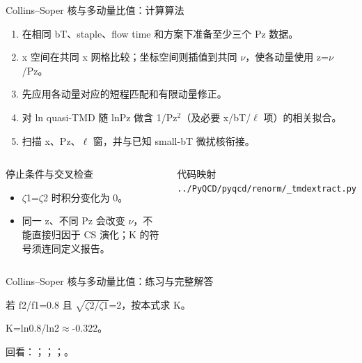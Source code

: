 \begin{frame}[t]{Collins--Soper 核与多动量比值：计算算法}
\footnotesize
{}\begin{enumerate}
\item 在相同 bT、staple、flow time 和方案下准备至少三个 Pz 数据。
\item x 空间在共同 x 网格比较；坐标空间则插值到共同 \ensuremath{\nu}，使各动量使用 z=\ensuremath{\nu}/\allowbreak{}Pz。
\item 先应用各动量对应的短程匹配和有限动量修正。
\item 对 ln quasi-TMD 随 lnPz 做含 1/\allowbreak{}Pz\ensuremath{^{2}}（及必要 x/\allowbreak{}bT/\allowbreak{}\ensuremath{\ell} 项）的相关拟合。
\item 扫描 x、Pz、\ensuremath{\ell} 窗，并与已知 small-bT 微扰核衔接。
\end{enumerate}\begin{columns}[T,onlytextwidth]
\begin{block}{停止条件与交叉检查}\scriptsize\begin{itemize}
\item[\CheckMark] \ensuremath{\zeta}1=\ensuremath{\zeta}2 时积分变化为 0。
\item[\CheckMark] 同一 z、不同 Pz 会改变 \ensuremath{\nu}，不能直接归因于 CS 演化；K 的符号须连同定义报告。
\end{itemize}\end{block}
\begin{block}{代码映射}
\scriptsize \texttt{.\allowbreak{}.\allowbreak{}/\allowbreak{}PyQCD/\allowbreak{}pyqcd/\allowbreak{}renorm/\allowbreak{}\_\allowbreak{}tmdextract.\allowbreak{}py}
\end{block}\end{columns}\end{frame}

\begin{frame}[t]{Collins--Soper 核与多动量比值：练习与完整解答}
\footnotesize
\begin{block}{}若 f2/\allowbreak{}f1=0.8 且 \ensuremath{\sqrt{\zeta2/\zeta1}}=2，按本式求 K。\end{block}
\begin{exampleblock}{}K=ln0.8/\allowbreak{}ln2\ensuremath{\approx}-0.322。\end{exampleblock}
\vfill
\scriptsize 回看：；；；。
\end{frame}

